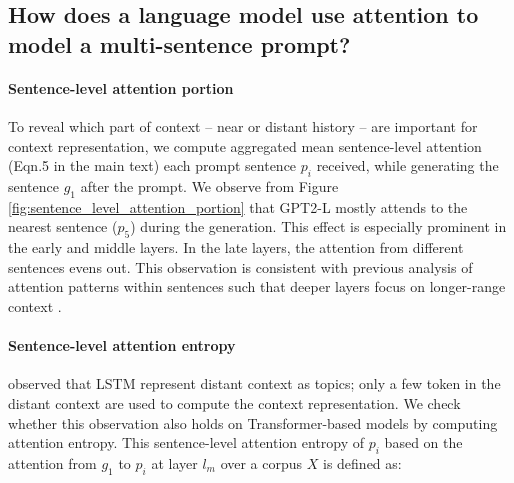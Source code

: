 \documentclass[11pt,a4paper]{article}
\begin{document}
\subsection{How does a language model use attention to model a multi-sentence prompt?} \label{appendix:multi_sentence_prompt}

\paragraph{Sentence-level attention portion}
To reveal which part of context -- near or distant history -- are important for context representation,  we compute aggregated mean sentence-level attention (Eqn.5 in the main text) each prompt sentence $p_i$ received, while generating the sentence $g_1$ after the prompt. We observe from Figure \ref{fig:sentence_level_attention_portion} that GPT2-L mostly attends to the nearest sentence ($p_5$) during the generation. This effect is especially prominent in the early and middle layers. In the late layers, the attention from different sentences evens out. This observation is consistent with previous analysis of attention patterns within sentences such that deeper layers focus on longer-range context \citep{vig-belinkov-2019-analyzing}.







\paragraph{Sentence-level attention entropy}
 observed that LSTM represent distant context as topics; only a few token in the distant context are used to compute the context representation. We check whether this observation also holds on Transformer-based models by computing attention entropy.  This sentence-level attention entropy of $p_i$ based on the attention from $g_1$ to $p_i$ at layer $l_m$ over a corpus $X$ is defined as: 
\end{document}
